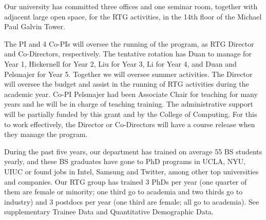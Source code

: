 \documentclass[11pt]{NSFamsart}
\begin{document}
 \iffalse
 Provide evidence of past success in training undergraduates, graduate students, and postdocs, identifying names, degree dates, and subsequent placement (including the flow of undergraduates into graduate programs). Applicants may refer to Trainee Data in supplemental documents, if included. Describe the plans, procedures, and personnel for the development and monitoring of all aspects of the project. In particular, discuss plans to ensure appropriate mentoring of students and postdoctoral associates, as well as the roles of the faculty involved. Provide evidence of faculty commitment necessary for the implementation of the proposed program. If the project involves international collaborations, industrial internships, or arrangements with government laboratories, businesses, or other departments, then the proposal should document existing arrangements, any plans for expanding these arrangements, and the personnel involved in managing these linkages.  
 \fi
 
Our university has committed three offices and one seminar room, together with adjacent large open space, for the RTG activities, in the 14th floor of the Michael Paul Galvin Tower. 
 
 The PI and 4 Co-PIs will oversee the running of the program, as RTG Director  and Co-Directors, respectively.  The tentative rotation has Duan to manage for Year 1, Hickernell for Year 2,    Liu for  Year 3, Li for Year 4, and Duan and Pelsmajer for Year 5.   Together we will oversee summer activities.  
The Director will oversee the budget and assist in the running of RTG activities during the academic year. Co-PI Pelsmajer had been
Associate Chair for teaching for many years and he will be in charge of teaching training. 
The administrative support will be partially funded by this grant and by the College of Computing. 
For this to work effectively, the Director or Co-Directors will have a course release when they manage the program.

During the past five years, our department has trained on average 55 BS students yearly, and these BS graduates have gone to PhD programs in UCLA, NYU, UIUC or found jobs in Intel, Samsung and Twitter,  among other top universities and companies. Our RTG group has trained 3 PhDs per year (one quarter of them are female or minority; one third go to academia and two thirds go to industry)  and 3 postdocs per year (one third are female; all go to academia).  See supplementary Trainee Data and Quantitative Demographic Data. 
\end{document}
